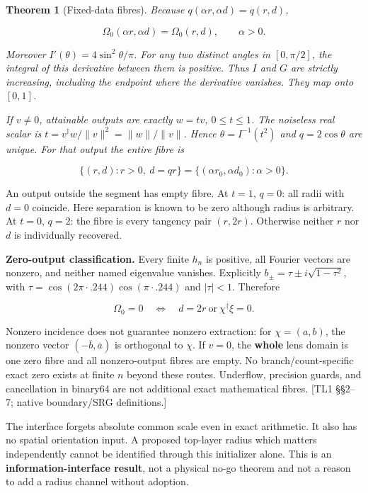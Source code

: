 \documentclass[11pt,a4paper]{article}
\newtheorem{theorem}{Theorem}[section]
\begin{document}
\begin{theorem}[Fixed-data fibres]\label{thm:fibres} Because \(q(\alpha r,\alpha d)=q(r,d)\),

\[
\Omega_0(\alpha r,\alpha d)=\Omega_0(r,d),\qquad \alpha>0.
\tag{M24}\label{eq:M24}
\]

Moreover \(I'(\theta)=4\sin^2\theta/\pi\). For any two distinct angles in \([0,\pi/2]\), the integral of this derivative between them is positive. Thus \(I\) and \(G\) are strictly increasing, including the endpoint where the derivative vanishes. They map onto \([0,1]\).

If \(v\ne0\), attainable outputs are exactly \(w=tv\), \(0\le t\le1\). The noiseless real scalar is \(t=v^\dagger w/\|v\|^2=\|w\|/\|v\|\). Hence \(\theta=I^{-1}(t^2)\) and \(q=2\cos\theta\) are unique. For that output the entire fibre is

\[
\{(r,d):r>0,\ d=q r\}
=\{(\alpha r_0,\alpha d_0):\alpha>0\}.
\tag{M25}\label{eq:M25}
\]

\end{theorem}
An output outside the segment has empty fibre. At \(t=1\), \(q=0\): all radii with \(d=0\) coincide. Here separation is known to be zero although radius is arbitrary. At \(t=0\), \(q=2\): the fibre is every tangency pair \((r,2r)\). Otherwise neither \(r\) nor \(d\) is individually recovered.

\textbf{Zero-output classification.} Every finite \(h_n\) is positive, all Fourier vectors are nonzero, and neither named eigenvalue vanishes. Explicitly \(b_\pm=\tau\pm i\sqrt{1-\tau^2}\), with \(\tau=\cos(2\pi\cdot.244)\cos(\pi\cdot.244)\) and \(|\tau|<1\). Therefore

\[
\Omega_0=0\quad\Longleftrightarrow\quad
d=2r\ \text{or}\ \chi^\dagger\xi=0.
\tag{M26}\label{eq:M26}
\]

Nonzero incidence does not guarantee nonzero extraction: for \(\chi=(a,b)\), the nonzero vector \((-\overline b,\overline a)\) is orthogonal to \(\chi\). If \(v=0\), the \textbf{whole} lens domain is one zero fibre and all nonzero-output fibres are empty. No branch/\allowbreak{}count-specific exact zero exists at finite \(n\) beyond these routes. Underflow, precision guards, and cancellation in binary64 are not additional exact mathematical fibres. [TL1 \S{}\S{}2--7; native boundary/\allowbreak{}SRG definitions.]

The interface forgets absolute common scale even in exact arithmetic. It also has no spatial orientation input. A proposed top-layer radius which matters independently cannot be identified through this initializer alone. This is an \textbf{information-interface result}, not a physical no-go theorem and not a reason to add a radius channel without adoption.
\end{document}
